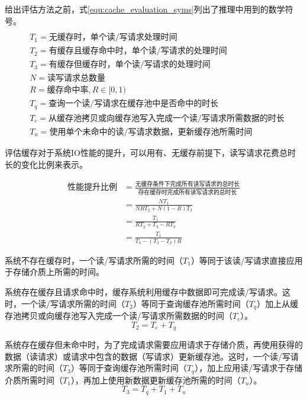 给出评估方法之前，式\ref{equ:cache_evaluation_syms}列出了推理中用到的数学符号。
\begin{equation}
\begin{split}
\\&T_1=\mbox{无缓存时，单个读/写请求处理时间}
\\&T_2=\mbox{有缓存且缓存命中时，单个读/写请求的处理时间}
\\&T_3=\mbox{有缓存但缓存时，单个读/写请求的处理时间}
\\&N=\mbox{读写请求总数量}
\\&R=\mbox{缓存命中率},R\in\lbrack0,1)
\\&T_q=\mbox{查询一个读/写请求在缓存池中是否命中的时长}
\\&T_c=\mbox{从缓存池拷贝或向缓存池写入完成一个读/写请求所需数据的时长}
\\&T_u=\mbox{使用单个未命中的读/写请求数据，更新缓存池所需时间}
\end{split}
\label{equ:cache_evaluation_syms}
\end{equation}

评估缓存对于系统IO性能的提升，可以用有、无缓存前提下，读写请求花费总时长的变化比例来表示。

\begin{equation}
\begin{split}
\mbox{性能提升比例}&=\frac{\mbox{无缓存条件下完成所有读写请求的总时长}}{\mbox{存在缓存时完成所有读写请求的总时长}}
\\&=\frac{NT_1}{NRT_2+N(1-R)T_3}
\\&=\frac{T_1}{RT_2+T_3-RT_3}
\\&=\frac{T_1}{T_3-(T_3-T_2)R}
\end{split}
\label{equ:cache_evaluation_enhance1}
\end{equation}

系统不存在缓存时，一个读/写请求所需的时间（$T_1$）等同于该读/写请求直接应用于存储介质上所需的时间。

系统存在缓存且请求命中时，缓存系统利用缓存中数据即可完成读/写请求。这时，一个读/写请求所需的时间（$T_2$）等同于查询缓存池所需时间（$T_q$）加上从缓存池拷贝或向缓存池写入完成一个读/写请求所需数据的时间（$T_c$）。
\begin{equation}
T_2=T_c+T_q
\end{equation}

系统存在缓存但未命中时，为了完成请求需要应用请求于存储介质，再使用获得的数据（读请求）或请求中包含的数据（写请求）更新缓存池。这时，一个读/写请求所需的时间（$T_3$）等同于查询缓存池所需时间（$T_q$），加上应用读/写请求于存储介质所需时间（$T_1$），再加上使用新数据更新缓存池所需的时间（$T_u$）。
\begin{equation}
T_3=T_q+T_1+T_u
\end{equation}

